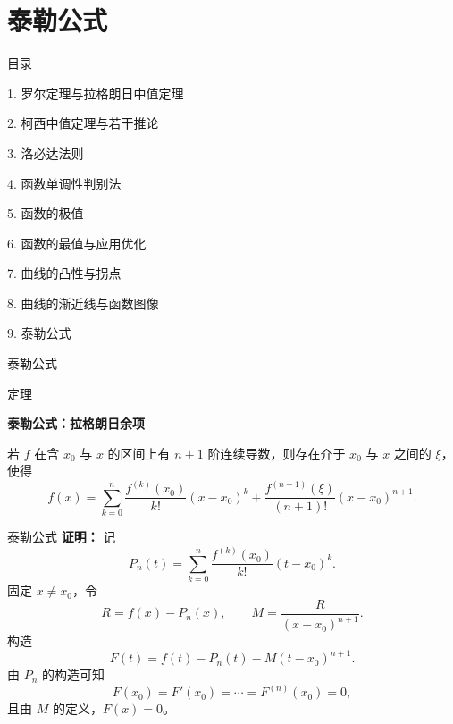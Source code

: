 \documentclass[aspectratio=169,10pt,fontset=fandol]{ctexbeamer}
\begin{document}
\section{泰勒公式}
\begin{frame}[t,fragile]{目录}
\normalsize
{\color{black}\normalsize 1. 罗尔定理与拉格朗日中值定理\par}\vspace{0.22em}
{\color{black}\normalsize 2. 柯西中值定理与若干推论\par}\vspace{0.22em}
{\color{black}\normalsize 3. 洛必达法则\par}\vspace{0.22em}
{\color{black}\normalsize 4. 函数单调性判别法\par}\vspace{0.22em}
{\color{black}\normalsize 5. 函数的极值\par}\vspace{0.22em}
{\color{black}\normalsize 6. 函数的最值与应用优化\par}\vspace{0.22em}
{\color{black}\normalsize 7. 曲线的凸性与拐点\par}\vspace{0.22em}
{\color{black}\normalsize 8. 曲线的渐近线与函数图像\par}\vspace{0.22em}
{\color{blue}\normalsize 9. 泰勒公式\par}\vspace{0.22em}
\end{frame}
\begin{frame}[t,fragile]{泰勒公式}
\footnotesize
\begin{block}{定理}
{\footnotesize
\textbf{泰勒公式：拉格朗日余项}\par

若 $f$ 在含 $x_0$ 与 $x$ 的区间上有 $n+1$ 阶连续导数，则存在介于 $x_0$ 与 $x$ 之间的 $\xi$，使得
\[
f(x)=\sum_{k=0}^{n}\frac{f^{(k)}(x_0)}{k!}(x-x_0)^k
+\frac{f^{(n+1)}(\xi)}{(n+1)!}(x-x_0)^{n+1}.
\]

}
\end{block}
\end{frame}
\begin{frame}[t,fragile]{泰勒公式}
\footnotesize
{\footnotesize
\textbf{证明：}
记
\[
P_n(t)=\sum_{k=0}^{n}\frac{f^{(k)}(x_0)}{k!}(t-x_0)^k.
\]
固定 $x\neq x_0$，令
\[
R=f(x)-P_n(x),\qquad
M=\frac{R}{(x-x_0)^{n+1}}.
\]
构造
\[
F(t)=f(t)-P_n(t)-M(t-x_0)^{n+1}.
\]
由 $P_n$ 的构造可知
\[
F(x_0)=F'(x_0)=\cdots=F^{(n)}(x_0)=0,
\]
且由 $M$ 的定义，$F(x)=0$。
}
\end{frame}
\end{document}
